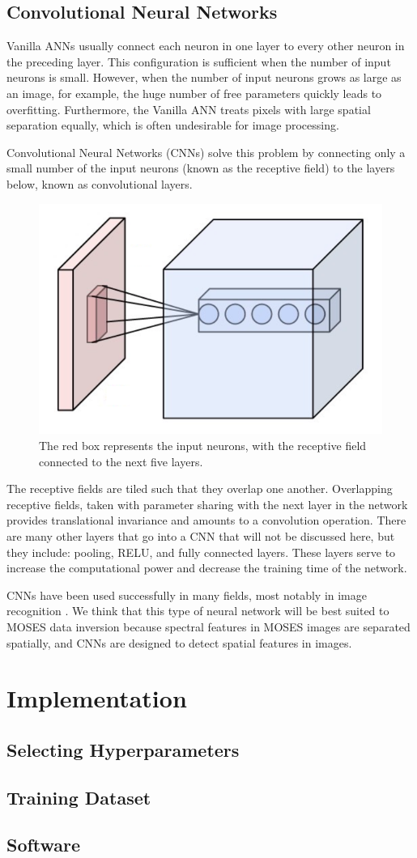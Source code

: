 \documentclass[twoside]{article}
\begin{document}
\begin{multicols}{2}
\subsection{Convolutional Neural Networks}
Vanilla ANNs usually connect each neuron in one layer to every other neuron in the preceding layer. This configuration is sufficient when the number of input neurons is small. However, when the number of input neurons grows as large as an image, for example, the huge number of free parameters quickly leads to overfitting. Furthermore, the Vanilla ANN treats pixels with large spatial separation equally, which is often undesirable for image processing. \par Convolutional Neural Networks (CNNs) solve this problem by connecting only a small number of the input neurons (known as the receptive field) to the layers below, known as convolutional layers.
\begin{figure}[H]
	\centering
	\includegraphics[width=0.5\linewidth]{images/Conv_layer}
	\caption{The red box represents the input neurons, with the receptive field connected to the next five layers.}
\end{figure}
The receptive fields are tiled such that they overlap one another. Overlapping receptive fields, taken with parameter sharing with the next layer in the network provides translational invariance and amounts to a convolution operation. There are many other layers that go into a CNN that will not be discussed here, but they include: pooling, RELU, and fully connected layers. These layers serve to increase the computational power and decrease the training time of the network. \par CNNs have been used successfully in many fields, most notably in image recognition \cite{imagenet}. We think that this type of neural network will be best suited to MOSES data inversion because spectral features in MOSES images are separated spatially, and CNNs are designed to detect spatial features in images.

\section{Implementation}
\subsection{Selecting Hyperparameters}
\subsection{Training Dataset}
\subsection{Software}

\end{multicols}

	
	
\end{document}
